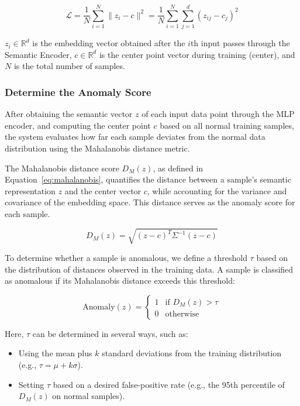 \begin{ZhChapter}
    \begin{equation}
        \mathcal{L} = \frac{1}{N} \sum_{i=1}^{N} \| z_i - c \|^2
        = \frac{1}{N} \sum_{i=1}^{N} \sum_{j=1}^{d} (z_{ij} - c_j)^2
        \label{eq:centerloss}
    \end{equation}

    $z_i \in \mathbb{R}^d$ is the embedding vector obtained after the $i$th input passes through the Semantic Encoder,
    $c \in \mathbb{R}^d$ is the center point vector during training (center), and $N$ is the total number of samples.



    \subsubsection{Determine the Anomaly Score}
    After obtaining the semantic vector $z$ of each input data point through the MLP encoder, and computing the center point $c$ based on all normal training samples, the system evaluates how far each sample deviates from the normal data distribution using the Mahalanobis distance metric.

    The Mahalanobis distance score $D_M(z)$, as defined in Equation~\ref{eq:mahalanobis}, quantifies the distance between a sample's semantic representation $z$ and the center vector $c$, while accounting for the variance and covariance of the embedding space. This distance serves as the anomaly score for each sample.

    \begin{equation}
        D_M(z) = \sqrt{(z - c)^T \Sigma^{-1} (z - c)}
    \end{equation}

    To determine whether a sample is anomalous, we define a threshold $\tau$ based on the distribution of distances observed in the training data. A sample is classified as anomalous if its Mahalanobis distance exceeds this threshold:

    \begin{equation}
        \text{Anomaly}(z) =
        \begin{cases}
            1 & \text{if } D_M(z) > \tau \\
            0 & \text{otherwise}
        \end{cases}
    \end{equation}

    Here, $\tau$ can be determined in several ways, such as:
    \begin{itemize}
        \item Using the mean plus $k$ standard deviations from the training distribution (e.g., $\tau = \mu + k\sigma$).
        \item Setting $\tau$ based on a desired false-positive rate (e.g., the 95th percentile of $D_M(z)$ on normal samples).
    \end{itemize}


\end{ZhChapter}
